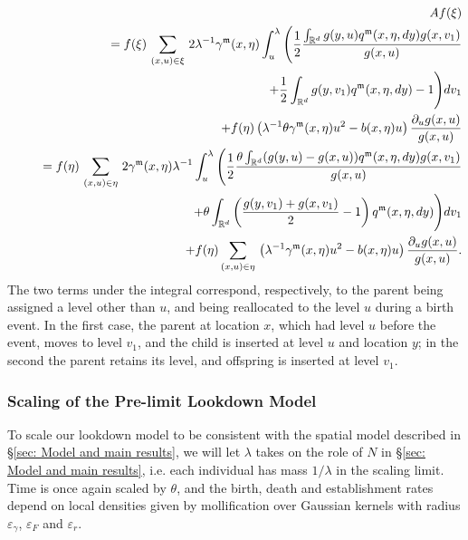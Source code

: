 \documentclass[12pt]{article}
\def \non{{\nonumber}}
\begin{document}
\begin{eqnarray}\label{Generator of prelimit simplest model}
&&Af(\xi ) \nonumber \\
&&\quad =f(\xi )\,\sum_{(x,u)\in\xi}\,2\lambda^{-1} \gamma^{\mathfrak{m}}(x, \eta)
\int_u^{
\lambda}\Bigg(\frac 12\frac {\int_{\mathbb{R}^d}g(y,u)q^{\mathfrak{m}}(x,\eta,d
y)g(x,v_1)}{g(x,u)} \label{multgen3}\\
&&\qquad\qquad\qquad\qquad\qquad\qquad\qquad\qquad\qquad\qquad
+\frac 12\int_{\mathbb{R}^d}g(y,v_1)q^{\mathfrak{m}}(x,\eta ,dy)-
1\Bigg)dv_1\nonumber\\
&&\quad \quad +f(\eta )\left(\lambda^{-1} \theta \gamma^{\mathfrak{m}}(x,\eta) u^2 -b(x,\eta)u\right)\frac {\partial_u g(x,u)}{g(x,u)}\nonumber\\
&&\quad =f(\eta )\,\sum_{(x,u)\in\eta}\,2 \gamma^{\mathfrak{m}}(x, \eta)\lambda^{-1}\int_u^{
\lambda}\Bigg(\frac 12\frac {\theta\int_{\mathbb{R}^d}(g(y,u)-g(x,u))q^{\mathfrak{m}}(x,\eta,dy)g(x,v_1)}{g(x,u)}\non\\
&&\qquad\qquad\qquad\qquad\qquad\qquad\qquad +\theta\int_{\mathbb{R}^d}\left(\frac{g(y,v_1)+g(x,v_1)}{2}-1\right)q^{\mathfrak{m}}(x,\eta,dy)\Bigg)dv_1\nonumber\\
&&\qquad\qquad
+f(\eta )\sum_{(x,u)\in\eta}\,\left(\lambda^{-1} \gamma^{\mathfrak{m}}(x,\eta) u^2 -b(x,\eta)u\right)\frac {\partial_u g(x,u)}{g(x,u)}.\nonumber
\end{eqnarray}
The two terms under the integral correspond, respectively,
to the parent being assigned a level other than $u$,
and being reallocated to the level $u$
during a birth event.
In the first case, the parent at location $x$,
which had level $u$ before the event,
moves to level $v_1$,
and the child is inserted at level $u$
and location $y$;
in the second the parent retains its level,
and offspring is inserted at level $v_1$.


\subsubsection*{Scaling of the Pre-limit Lookdown Model}

To scale our lookdown model to be consistent with
the spatial model described in \S \ref{sec: Model and main results},
we will let $\lambda$ takes on the role of $N$
in \S \ref{sec: Model and main results},
i.e. each individual has mass $1/\lambda$
in the scaling limit.
Time is once again scaled by $\theta$,
and the birth, death and establishment rates 
depend on local densities given by
mollification over Gaussian kernels with radius
$\varepsilon_{\gamma}$, $\varepsilon_{F}$ and $\varepsilon_{r}$.
\end{document}
